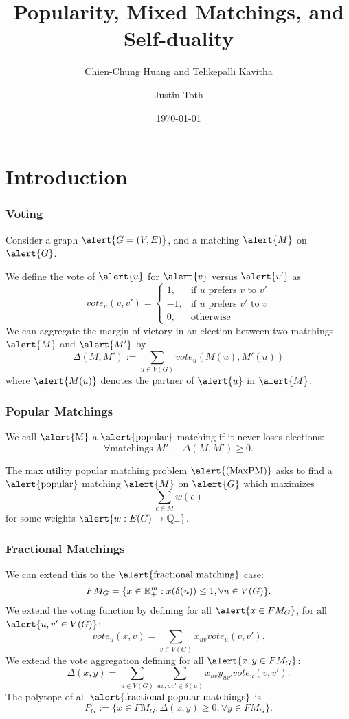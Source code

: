 \documentclass[10pt]{beamer}
\title{Popularity, Mixed Matchings, and Self-duality}
\subtitle{Chien-Chung Huang and Telikepalli Kavitha}
\date{\today}
\author{Justin Toth}
\institute{University of Waterloo}
\newcommand{\Q}{\mathbb{Q}}
\begin{document}
\maketitle

\section{Introduction}

\begin{frame}
\frametitle{Voting}
Consider a graph $\alert{G = (V,E)}$, and a matching $\alert{M}$ on $\alert{G}$.

We define the vote of $\alert{u}$ for $\alert{v}$ versus $\alert{v'}$ as
$$vote_u(v,v') = \begin{cases}
1, &\text{if $u$ prefers $v$ to $v'$} \\
-1, &\text{if $u$ prefers $v'$ to $v$} \\
0, &\text{otherwise}
\end{cases}
$$
We can aggregate the margin of victory in an election between two matchings $\alert{M}$ and $\alert{M'}$ by
$$\Delta(M,M') := \sum_{u \in V(G)} vote_u(M(u), M'(u)) $$
where $\alert{M(u)}$ denotes the partner of $\alert{u}$ in $\alert{M}$.
\end{frame}

\begin{frame}
\frametitle{Popular Matchings}
We call $\text{\alert{M}}$ a $\text{\alert{popular}}$ matching if it never loses elections:
$$\forall \text{matchings } M', \quad \Delta(M,M') \geq 0.$$


The max utility popular matching problem $\text{\alert{(MaxPM)}}$ asks to find a $\text{\alert{popular}}$ matching $\alert{M}$ on $\alert{G}$ which maximizes
$$\sum_{e\in M} w(e)$$
for some weights $\alert{ w: E(G) \rightarrow \Q_+}$.
\end{frame}

\begin{frame}
\frametitle{Fractional Matchings}
We can extend this to the $\text{\alert{fractional matching}}$ case:
$$FM_{G} = \{x \in \mathbb{R}^m_+ : x(\delta(u)) \leq 1, \forall u \in V(G)\}.$$
We extend the voting function by defining for all $\alert{x \in FM_G}$, for all $\alert{u,v' \in V(G)}$:
$$vote_u(x,v) = \sum_{v\in V(G)} x_{uv} vote_u(v,v').$$ 
We extend the vote aggregation defining for all $\alert{x, y \in FM_{G}}$:
$$\Delta(x,y) = \sum_{u \in V(G)} \sum_{uv, uv' \in \delta(u)} x_{uv}y_{uv'} vote_u(v,v').$$
The polytope of all $\text{\alert{fractional popular matchings}}$ is 
$$P_G := \{x \in FM_{G}: \Delta(x,y) \geq 0, \forall y \in FM_G\}.$$
\end{frame}
\end{document}
